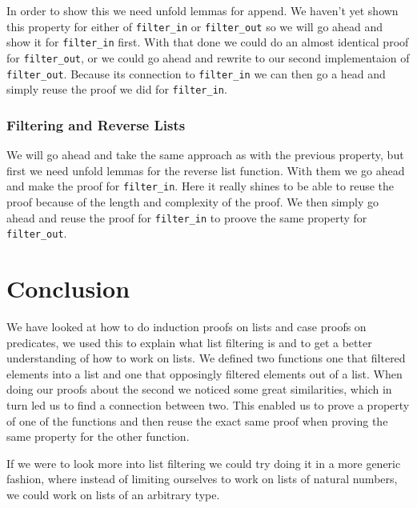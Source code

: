 \documentclass{article}
\begin{document}
In order to show this we need unfold lemmas for append. We haven't yet shown this property for either of \texttt{filter\_in} or \texttt{filter\_out} so we will go ahead and show it for \texttt{filter\_in} first. With that done we could do an almost identical proof for \texttt{filter\_out}, or we could go ahead and rewrite to our second implementaion of \texttt{filter\_out}. Because its connection to \texttt{filter\_in} we can then go a head and simply reuse the proof we did for \texttt{filter\_in}.

\subsubsection{Filtering and Reverse Lists}
We will go ahead and take the same approach as with the previous property, but first we need unfold lemmas for the reverse list function. With them we go ahead and make the proof for \texttt{filter\_in}. Here it really shines to be able to reuse the proof because of the length and complexity of the proof. We then simply go ahead and reuse the proof for \texttt{filter\_in} to proove the same property for \texttt{filter\_out}.

\section{Conclusion}
We have looked at how to do induction proofs on lists and case proofs on predicates, we used this to explain what list filtering is and to get a better understanding of how to work on lists. We defined two functions one that filtered elements into a list and one that opposingly filtered elements out of a list. When doing our proofs about the second we noticed some great similarities, which in turn led us to find a connection between two. This enabled us to prove a property of one of the functions and then reuse the exact same proof when proving the same property for the other function.

If we were to look more into list filtering we could try doing it in a more generic fashion, where instead of limiting ourselves to work on lists of natural numbers, we could work on lists of an arbitrary type.
\end{document}

